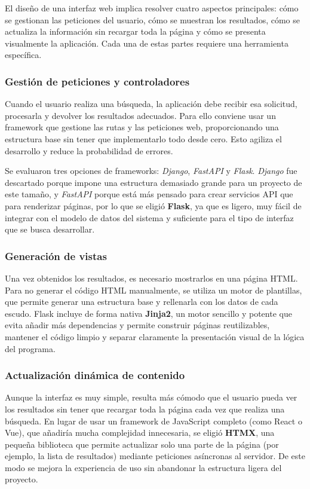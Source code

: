 El diseño de una interfaz web implica resolver cuatro aspectos principales: cómo se gestionan las peticiones del 
usuario, cómo se muestran los resultados, cómo se actualiza la información sin recargar toda la página y cómo se 
presenta visualmente la aplicación. Cada una de estas partes requiere una herramienta específica.

\subsubsection{Gestión de peticiones y controladores}
Cuando el usuario realiza una búsqueda, la aplicación debe recibir esa solicitud, procesarla y devolver los 
resultados adecuados. Para ello conviene usar un framework que gestione las rutas y las peticiones web,
proporcionando una estructura base sin tener que implementarlo todo desde cero. Esto agiliza el desarrollo y
reduce la probabilidad de errores.

Se evaluaron tres opciones de frameworks: \textit{Django}, \textit{FastAPI} y \textit{Flask}. 
\textit{Django} fue descartado porque impone una estructura demasiado grande para un proyecto de este tamaño, 
y \textit{FastAPI} porque está más pensado para crear servicios API que para renderizar páginas, por lo que
se eligió \textbf{Flask}, ya que es ligero, muy fácil de integrar con el modelo de datos del sistema y 
suficiente para el tipo de interfaz que se busca desarrollar.

\subsubsection{Generación de vistas}
Una vez obtenidos los resultados, es necesario mostrarlos en una página HTML. 
Para no generar el código HTML manualmente, se utiliza un motor de plantillas, 
que permite generar una estructura base y rellenarla con los datos de cada escudo.  
Flask incluye de forma nativa \textbf{Jinja2}, un motor sencillo y potente que evita añadir más dependencias y
permite construir páginas reutilizables, mantener el código limpio y separar claramente la presentación visual 
de la lógica del programa.

\subsubsection{Actualización dinámica de contenido}
Aunque la interfaz es muy simple, resulta más cómodo que el usuario pueda ver los resultados 
sin tener que recargar toda la página cada vez que realiza una búsqueda.  
En lugar de usar un framework de JavaScript completo (como React o Vue), que añadiría mucha complejidad 
innecesaria, se eligió \textbf{HTMX}, una pequeña biblioteca que permite actualizar solo una parte de la página 
(por ejemplo, la lista de resultados) mediante peticiones asíncronas al servidor. De este modo se mejora la 
experiencia de uso sin abandonar la estructura ligera del proyecto.


